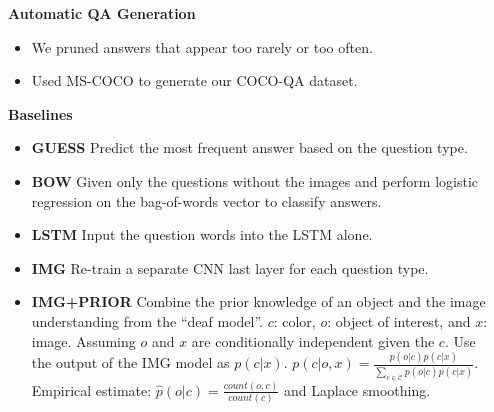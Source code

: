 \documentclass{beamer}
\renewcommand{\*}[1]{\textbf{#1}}
\begin{document}
\begin{frame}{}
\begin{columns}[T]
\begin{column}{0.32\linewidth}
\begin{block}{\bf{\large Automatic QA Generation}}
\begin{itemize}
\begin{figure}[h!]

\vspace{5mm}
\end{figure}

\item We pruned answers that appear too rarely or too often.
\item Used MS-COCO to generate our COCO-QA dataset.
\end{itemize}

\end{block}
\vfill

\begin{block}{\bf{\large Baselines}}
\begin{itemize}
\item \*{GUESS} Predict the most frequent answer based on the question type.

\item \*{BOW} Given only the questions without the images and perform logistic
regression on the bag-of-words vector to classify answers.

\item \*{LSTM} Input the question words into the LSTM alone.

\item \*{IMG} Re-train a separate CNN last layer for each question type.

\item \*{IMG+PRIOR} Combine the prior knowledge of an object and the image
understanding from the ``deaf model''. $c$: color, $o$: object of interest, and
$x$: image. Assuming $o$ and $x$ are conditionally independent given the $c$.
Use the output of the IMG model as $p(c | x)$. $p(c | o, x) = \frac{p(o | c)
p(c | x)}{\sum_{c \in \mathcal{C}} p(o | c) p(c | x)}$. Empirical estimate:
$\hat{p}(o | c) = \frac{count(o, c)}{count(c)}$ and Laplace smoothing.
\end{itemize}
\end{block}
\vfill

\endminipage
\end{column}

\begin{column}{0.32\linewidth}
\minipage[t][0.9\textheight][s]{\columnwidth}


\end{column}
\end{columns}
\end{frame}
\end{document}
